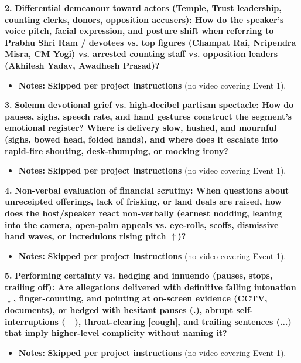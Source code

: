 \documentclass[10pt,a4paper]{article}
\begin{document}
\noindent\textbf{2.} \textbf{Differential demeanour toward actors (Temple, Trust leadership, counting clerks, donors, opposition accusers): How do the speaker's voice pitch, facial expression, and posture shift when referring to Prabhu Shri Ram / devotees vs. top figures (Champat Rai, Nripendra Misra, CM Yogi) vs. arrested counting staff vs. opposition leaders (Akhilesh Yadav, Awadhesh Prasad)?}\par\smallskip
\begin{itemize}
  \item \textbf{Notes:}
\textbf{Skipped per project instructions} (no video covering Event 1).\par\smallskip
\end{itemize}

\noindent\textbf{3.} \textbf{Solemn devotional grief vs. high-decibel partisan spectacle: How do pauses, sighs, speech rate, and hand gestures construct the segment's emotional register? Where is delivery slow, hushed, and mournful (sighs, bowed head, folded hands), and where does it escalate into rapid-fire shouting, desk-thumping, or mocking irony?}\par\smallskip
\begin{itemize}
  \item \textbf{Notes:}
\textbf{Skipped per project instructions} (no video covering Event 1).\par\smallskip
\end{itemize}

\noindent\textbf{4.} \textbf{Non-verbal evaluation of financial scrutiny: When questions about unreceipted offerings, lack of frisking, or land deals are raised, how does the host/speaker react non-verbally (earnest nodding, leaning into the camera, open-palm appeals vs. eye-rolls, scoffs, dismissive hand waves, or incredulous rising pitch $\uparrow$)?}\par\smallskip
\begin{itemize}
  \item \textbf{Notes:}
\textbf{Skipped per project instructions} (no video covering Event 1).\par\smallskip
\end{itemize}

\noindent\textbf{5.} \textbf{Performing certainty vs. hedging and innuendo (pauses, stops, trailing off): Are allegations delivered with definitive falling intonation $\downarrow$, finger-counting, and pointing at on-screen evidence (CCTV, documents), or hedged with hesitant pauses (.), abrupt self-interruptions (---), throat-clearing [cough], and trailing sentences (...) that imply higher-level complicity without naming it?}\par\smallskip
\begin{itemize}
  \item \textbf{Notes:}
\textbf{Skipped per project instructions} (no video covering Event 1).\par\smallskip
\end{itemize}
\end{document}

